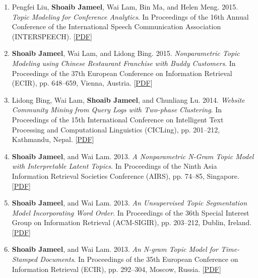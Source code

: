 \documentclass[margin]{res}
\begin{document}
\begin{resume}
\begin{enumerate}
\item Pengfei Liu, \textbf{Shoaib Jameel}, Wai Lam, Bin Ma, and Helen Meng. 2015. \textit{Topic Modeling for Conference Analytics}. In Proceedings of the 16th Annual Conference of the International Speech Communication Association (INTERSPEECH). [\href{https://drive.google.com/file/d/11Bz2_A6kpyR01ED8rnfECo4aDNKvH-yF/view?usp=sharing}{PDF}]  \newline

\item \textbf{Shoaib Jameel}, Wai Lam, and Lidong Bing. 2015. \textit{Nonparametric Topic Modeling using Chinese Restaurant Franchise with Buddy Customers}. In Proceedings of the 37th European Conference on Information Retrieval (ECIR), pp. 648--659, Vienna, Austria. [\href{https://drive.google.com/file/d/1m52uOZw3tPxPp3LkPfqEyR-LkPTi_m5q/view?usp=sharing}{PDF}]  \newline

\item Lidong Bing, Wai Lam, \textbf{Shoaib Jameel}, and Chunliang Lu. 2014. \textit{Website Community Mining from Query Logs with Two-phase Clustering}. In Proceedings of the 15th International
Conference on Intelligent Text Processing and Computational Linguistics (CICLing), pp. 201--212, Kathmandu, Nepal. [\href{https://drive.google.com/file/d/1INsfUIRtjIuCzLXa_dlmkR_B07lp2tC9/view?usp=sharing}{PDF}]  \newline

\item  \textbf{Shoaib Jameel}, and Wai Lam. 2013. \textit{A Nonparametric N-Gram Topic Model with Interpretable Latent Topics}. In Proceedings of the Ninth Asia Information Retrieval Societies Conference (AIRS), pp. 74--85, Singapore. [\href{https://drive.google.com/file/d/18jXDQmbGjBDzrJXSJ9tRLcRa0DH_MLVJ/view?usp=sharing}{PDF}]  \newline

\item \textbf{Shoaib Jameel}, and Wai Lam. 2013. \textit{An Unsupervised Topic Segmentation Model Incorporating Word Order}. In Proceedings of the 36th Special Interest Group on Information Retrieval (ACM-SIGIR), pp. 203--212, Dublin, Ireland. [\href{https://drive.google.com/file/d/18F6SyQP5ipi4MUbXhqAlsi92Ri7T3d3K/view?usp=sharing}{PDF}] \\

\item  \textbf{Shoaib Jameel}, and Wai Lam. 2013. \textit{An N-gram Topic Model for Time-Stamped Documents}. In Proceedings of the 35th European Conference on Information Retrieval (ECIR), pp. 292--304, Moscow, Russia. [\href{https://drive.google.com/file/d/1wR1Yeyw5l9rf1UD1SxpWTfUaUo5P34Eo/view?usp=sharing}{PDF}]\\


\end{enumerate}
\end{resume}
\end{document}
